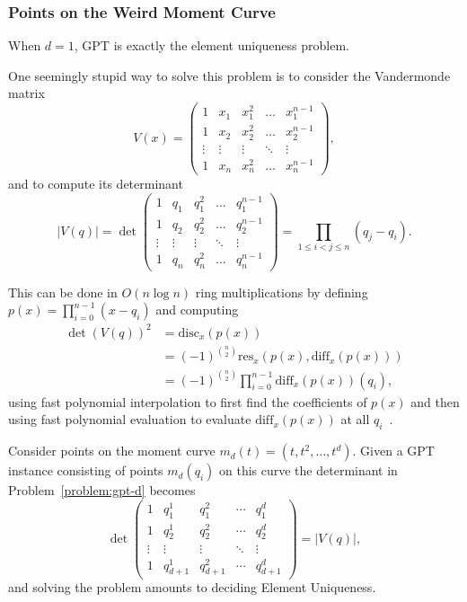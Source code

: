 \subsubsection{Points on the Weird Moment Curve}

When \(d=1\), GPT is exactly the element uniqueness problem.
%


One seemingly stupid way to solve this problem is to
consider the Vandermonde matrix
%
\begin{displaymath}
V(x) = \begin{pmatrix}
    1       & x_1     & x_1^2     & \dots  & x_1^{n-1}     \\
    1       & x_2     & x_2^2     & \dots  & x_2^{n-1}     \\
    \vdots  & \vdots  & \vdots    & \ddots & \vdots        \\
    1       & x_n & x_n^2 & \dots  & x_n^{n-1}
\end{pmatrix},
\end{displaymath}
%
and to compute its determinant
%
\begin{displaymath}
|V(q)| = \det\begin{pmatrix}
    1       & q_1     & q_1^2     & \dots  & q_1^{n-1}     \\
    1       & q_2     & q_2^2     & \dots  & q_2^{n-1}     \\
    \vdots  & \vdots  & \vdots    & \ddots & \vdots        \\
    1       & q_n & q_n^2 & \dots  & q_n^{n-1}
\end{pmatrix}
=
\prod_{1 \leq i < j \leq n} (q_j - q_i).
\end{displaymath}

This can be done in \(O(n \log n)\) ring multiplications
by defining
%
\(p(x) = \prod_{i=0}^{n-1} (x-q_i)\)
%
and computing
%
\begin{align*}
{\det(V(q))}^2 &= \mathrm{disc}_x(p(x)) \\
&= {(-1)}^{\binom{n}{2}} \mathrm{res}_x(p(x), \mathrm{diff}_x(p(x))) \\
&= {(-1)}^{\binom{n}{2}} \prod_{i=0}^{n-1} \mathrm{diff}_x(p(x))(q_i),
\end{align*}
%
using fast polynomial interpolation to first find the coefficients of
\(p(x)\) and then using fast polynomial evaluation to evaluate
\(\mathrm{diff}_x(p(x))\) at all \(q_i\)~\cite{St73,Ku73a,Ku73b,ASU75}.

Consider points on the moment curve $m_d(t) = (t, t^2, \ldots, t^d)$. Given a
GPT instance consisting of points $m_d(q_i)$ on this curve the determinant
in Problem~\ref{problem:gpt-d} becomes
%
\begin{displaymath}
\det\begin{pmatrix}
1      & q_1^1 & q_1^2 & \cdots & q_1^d \\
1      & q_2^1 & q_2^2 & \cdots & q_2^d \\
\vdots & \vdots  & \vdots  & \ddots & \vdots  \\
1      & q_{d+1}^1 & q_{d+1}^2 & \cdots & q_{d+1}^d
\end{pmatrix}
=
|V(q)|,
\end{displaymath}
and solving the problem amounts to deciding Element Uniqueness.

